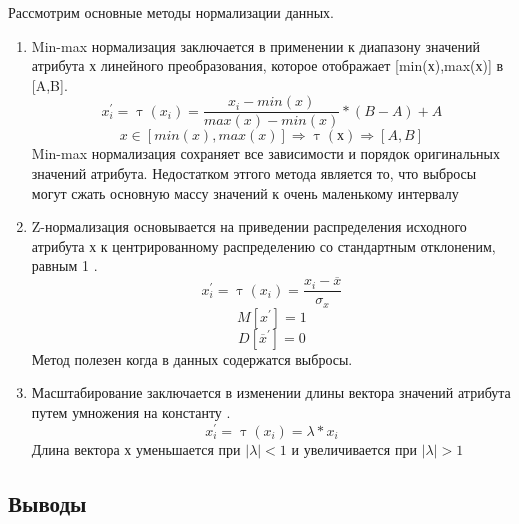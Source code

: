 Рассмотрим основные методы нормализации данных.
\begin{enumerate}
	\item Min-max нормализация заключается в применении к диапазону значений атрибута х линейного преобразования, которое отображает [min(х),max(х)] в [A,B].
	\begin{equation}
	\label{mixmaxNorm}
	x^\prime_i=\uptau(x_i)=\frac{x_i - min(x)}{max(x) - min(x)}*(B-A) + A
	\end{equation}
	\begin{equation}
	x \in[min(x), max(x)] \Rightarrow \uptau(х) \Rightarrow [A,B]
	\end{equation}
	Min-max нормализация сохраняет все зависимости и порядок оригинальных значений атрибута. Недостатком этгого метода является то, что выбросы могут сжать основную массу значений к очень маленькому интервалу
	\item Z-нормализация  основывается на приведении распределения исходного атрибута х  к центрированному распределению со стандартным отклоненим, равным 1 \cite{Book25} .
	\begin{equation}
	\label{ZNormalization}
	x^\prime_i=\uptau(x_i) =\frac{x_i - \overline{x}}{\sigma_x}
	\end{equation}
	\begin{equation}
	M[x^\prime]=1	 
	\end{equation}
	\begin{equation}
	D[\overline{x}^\prime]=0	 
	\end{equation}
	Метод полезен когда в данных содержатся выбросы.
	\item Масштабирование заключается в изменении длины вектора значений атрибута путем умножения на константу \cite{Book06} .
	\begin{equation}
	x^\prime_i=\uptau(x_i)=\lambda*x_i
	\end{equation}
	Длина вектора х уменьшается при $|\lambda|<1$ и увеличивается при $|\lambda|>1$ 
\end{enumerate}
\subsection{Выводы}

